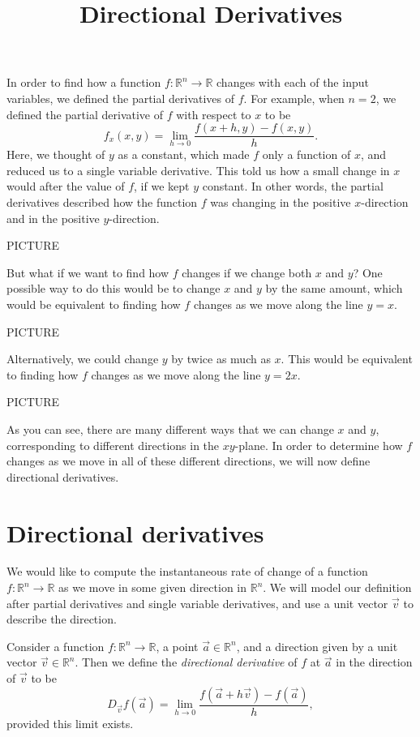 \documentclass{ximera}
\title{Directional Derivatives}
\begin{document}
\begin{abstract}
\end{abstract}
\maketitle

In order to find how a function $f:\mathbb{R}^n\rightarrow\mathbb{R}$ changes with each of the input variables, we defined the partial derivatives of $f$. For example, when $n=2$, we defined the partial derivative of $f$ with respect to $x$ to be
\[
f_x(x,y)=\lim_{h\rightarrow 0}\frac{f(x+h,y)-f(x,y)}{h}.
\]
Here, we thought of $y$ as a constant, which made $f$ only a function of $x$, and reduced us to a single variable derivative. This told us how a small change in $x$ would after the value of $f$, if we kept $y$ constant. In other words, the partial derivatives described how the function $f$ was changing in the positive $x$-direction and in the positive $y$-direction.

PICTURE

But what if we want to find how $f$ changes if we change both $x$ and $y$? One possible way to do this would be to change $x$ and $y$ by the same amount, which would be equivalent to finding how $f$ changes as we move along the line $y=x$.

PICTURE

Alternatively, we could change $y$ by twice as much as $x$. This would be equivalent to finding how $f$ changes as we move along the line $y=2x$.

PICTURE

As you can see, there are many different ways that we can change $x$ and $y$, corresponding to different directions in the $xy$-plane. In order to determine how $f$ changes as we move in all of these different directions, we will now define directional derivatives.

\section*{Directional derivatives}

We would like to compute the instantaneous rate of change of a function $f:\mathbb{R}^n\rightarrow\mathbb{R}$ as we move in some given direction in $\mathbb{R}^n$. We will model our definition after partial derivatives and single variable derivatives, and use a unit vector $\vec{v}$ to describe the direction.

\begin{definition}
Consider a function $f:\mathbb{R}^n\rightarrow\mathbb{R}$, a point $\vec{a}\in\mathbb{R}^n$, and a direction given by a unit vector $\vec{v}\in\mathbb{R}^n$. Then we define the \emph{directional derivative} of $f$ at $\vec{a}$ in the direction of $\vec{v}$ to be
\[
D_{\vec{v}}f(\vec{a}) = \lim_{h\rightarrow 0}\frac{f(\vec{a}+h\vec{v})-f(\vec{a})}{h},
\]
provided this limit exists.
\end{definition}
\end{document}
